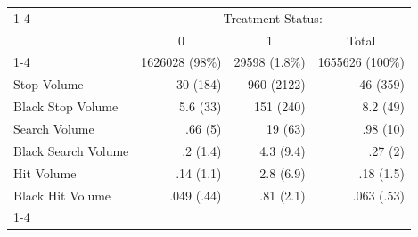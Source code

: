\documentclass{article}
\begin{document}
\begin{table}[!h]
\centering
\begin{tabular}{llll}
\cline{1-4}
\multicolumn{1}{r}{} &
  \multicolumn{3}{c}{Treatment Status:} \\
\multicolumn{1}{r}{} &
  \multicolumn{1}{c}{0} &
  \multicolumn{1}{c}{1} &
  \multicolumn{1}{c}{Total} \\
\cline{1-4}
\multicolumn{1}{l}{N} &
  \multicolumn{1}{r}{1626028 (98\%)} &
  \multicolumn{1}{r}{29598 (1.8\%)} &
  \multicolumn{1}{r}{1655626 (100\%)} \\
\multicolumn{1}{l}{Stop Volume} &
  \multicolumn{1}{r}{30 (184)} &
  \multicolumn{1}{r}{960 (2122)} &
  \multicolumn{1}{r}{46 (359)} \\
\multicolumn{1}{l}{Black Stop Volume} &
  \multicolumn{1}{r}{5.6 (33)} &
  \multicolumn{1}{r}{151 (240)} &
  \multicolumn{1}{r}{8.2 (49)} \\
\multicolumn{1}{l}{Search Volume} &
  \multicolumn{1}{r}{.66 (5)} &
  \multicolumn{1}{r}{19 (63)} &
  \multicolumn{1}{r}{.98 (10)} \\
\multicolumn{1}{l}{Black Search Volume} &
  \multicolumn{1}{r}{.2 (1.4)} &
  \multicolumn{1}{r}{4.3 (9.4)} &
  \multicolumn{1}{r}{.27 (2)} \\
\multicolumn{1}{l}{Hit Volume} &
  \multicolumn{1}{r}{.14 (1.1)} &
  \multicolumn{1}{r}{2.8 (6.9)} &
  \multicolumn{1}{r}{.18 (1.5)} \\
\multicolumn{1}{l}{Black Hit Volume} &
  \multicolumn{1}{r}{.049 (.44)} &
  \multicolumn{1}{r}{.81 (2.1)} &
  \multicolumn{1}{r}{.063 (.53)} \\
\cline{1-4}
\end{tabular}
\end{table}
\end{document}
